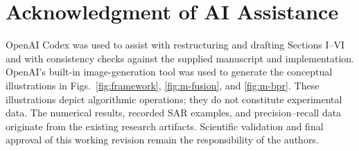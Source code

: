 \section*{Acknowledgment of AI Assistance}
OpenAI Codex was used to assist with restructuring and drafting Sections I--VI and with consistency checks against the supplied manuscript and implementation. OpenAI's built-in image-generation tool was used to generate the conceptual illustrations in Figs.~\ref{fig:framework}, \ref{fig:m-fusion}, and \ref{fig:m-bpr}. These illustrations depict algorithmic operations; they do not constitute experimental data. The numerical results, recorded SAR examples, and precision--recall data originate from the existing research artifacts. Scientific validation and final approval of this working revision remain the responsibility of the authors.
